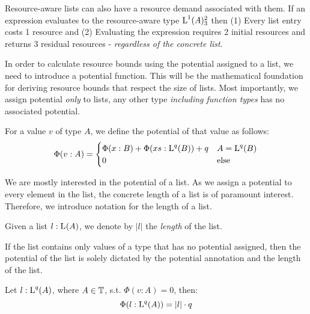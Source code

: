 \begin{remark}
   Resource-aware lists can also have a resource demand associated with them. If an expression evaluates to the resource-aware type \(\text{L}^{1}(A) ^{2}_{3}\) then (1) Every list entry costs 1 resource and (2) Evaluating the expression requires 2 initial resources and returns 3 residual resources - \emph{regardless of the concrete list}.
   \end{remark}

In order to calculate resource bounds using the potential assigned to a list, we need to introduce a potential function. This will be the mathematical foundation for deriving resource bounds that respect the size of lists. Most importantly, we assign potential \emph{only} to lists, any other type \emph{including function types} has no associated potential. 

\begin{definition}\label{def:potential-function}
   For a value \(v\) of type \(A\), we define the potential of that value as follows:
   \[
      \Phi(v : A) = \begin{cases}
         \Phi(x : B) + \Phi(xs : \text{L}^{q}(B)) + q   & A = \text{L}^{q}(B)\\
         0                                            & \text{else}
      \end{cases}
   \]
\end{definition}

We are mostly interested in the potential of a list. As we assign a potential to every element in the list, the concrete length of a list is of paramount interest. Therefore, we introduce notation for the length of a list.

\begin{definition}\label{def:list-length}
   Given a list \(l : \text{L}^{}(A)\), we denote by \(|l|\) the \emph{length} of the list.
\end{definition}

If the list contains only values of a type that has no potential assigned, then the potential of the list is solely dictated by the potential annotation and the length of the list. 

\begin{corollary}\label{cor:potential-list}
   Let \(l : \text{L}^{q}(A)\), where \(A \in \mathbb{T}\), s.t. \(\Phi(v : A) = 0\), then:
   \[
      \Phi(l : \text{L}^{q}(A)) = |l| \cdot q
   \]
\end{corollary}

